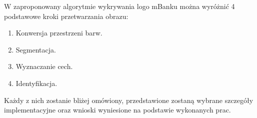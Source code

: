W zaproponowany algorytmie wykrywania logo mBanku można wyróżnić 4 podstawowe kroki przetwarzania obrazu:
\begin{enumerate}[topsep=1pt,itemsep=0ex,partopsep=1ex,parsep=1ex]
    \item Konwersja przestrzeni barw.
    \item Segmentacja.
    \item Wyznaczanie cech.
    \item Identyfikacja.
\end{enumerate}
Każdy z nich zostanie bliżej omówiony, przedstawione zostaną wybrane szczegóły implementacyjne oraz wnioski wyniesione na podstawie wykonanych prac.
